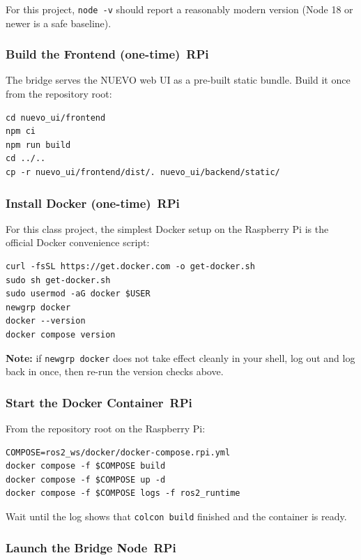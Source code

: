 \documentclass{ol-softwaremanual}
\newcommand{\onrpi}{%
  \,\colorbox{blue!20}{\footnotesize\sffamily\bfseries RPi}}
\begin{document}
For this project, \texttt{node -v} should report a reasonably modern version
(Node 18 or newer is a safe baseline).

\subsubsection{Build the Frontend (one-time)\onrpi}

The bridge serves the NUEVO web UI as a pre-built static bundle.
Build it once from the repository root:

\begin{verbatim}
cd nuevo_ui/frontend
npm ci
npm run build
cd ../..
cp -r nuevo_ui/frontend/dist/. nuevo_ui/backend/static/
\end{verbatim}

\subsubsection{Install Docker (one-time)\onrpi}

For this class project, the simplest Docker setup on the Raspberry Pi is the
official Docker convenience script:

\begin{verbatim}
curl -fsSL https://get.docker.com -o get-docker.sh
sudo sh get-docker.sh
sudo usermod -aG docker $USER
newgrp docker
docker --version
docker compose version
\end{verbatim}

\textbf{Note:} if \texttt{newgrp docker} does not take effect cleanly in your
shell, log out and log back in once, then re-run the version checks above.

\subsubsection{Start the Docker Container\onrpi}

From the repository root on the Raspberry Pi:

\begin{verbatim}
COMPOSE=ros2_ws/docker/docker-compose.rpi.yml
docker compose -f $COMPOSE build
docker compose -f $COMPOSE up -d
docker compose -f $COMPOSE logs -f ros2_runtime
\end{verbatim}

Wait until the log shows that \texttt{colcon build} finished and the container is ready.

\subsubsection{Launch the Bridge Node\onrpi}
\end{document}
